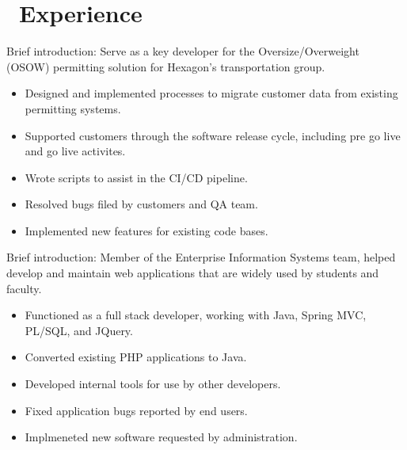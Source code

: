 \documentclass{resume}
\begin{document}



\section{\faUsers\ Experience}
\role{Software Analyst}
Brief introduction: Serve as a key developer for the Oversize/Overweight (OSOW) permitting solution for Hexagon's transportation group.
\begin{itemize}
  \item Designed and implemented processes to migrate customer data from existing permitting systems.
  \item Supported customers through the software release cycle, including pre go live and go live activites.
  \item Wrote scripts to assist in the CI/CD pipeline.
  \item Resolved bugs filed by customers and QA team.
  \item Implemented new features for existing code bases.
\end{itemize}

Brief introduction: Member of the Enterprise Information Systems team, helped develop and maintain web applications that are widely used by students and faculty.
\begin{itemize}
  \item Functioned as a full stack developer, working with Java, Spring MVC, PL/SQL, and JQuery.
  \item Converted existing PHP applications to Java.
  \item Developed internal tools for use by other developers.
  \item Fixed application bugs reported by end users.
  \item Implmeneted new software requested by administration.
\end{itemize}
\end{document}
